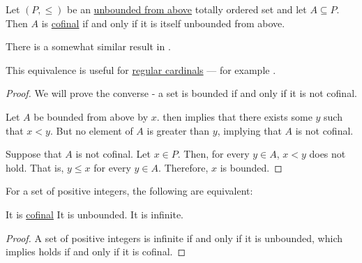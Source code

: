\begin{proposition}\label{thm:totally_ordered_cofinal_equivalences}
  Let \( (P, \leq) \) be an \hyperref[def:extremal_points/upper_and_lower_bounds]{unbounded from above} totally ordered set and let \( A \subseteq P \). Then \( A \) is \hyperref[def:cofinal_set]{cofinal} if and only if it is itself unbounded from above.
\end{proposition}
\begin{comments}
  \item There is a somewhat similar result in .
  \item This equivalence is useful for \hyperref[def:regular_cardinal]{regular cardinals} --- for example .
\end{comments}
\begin{proof}
  We will prove the converse - a set is bounded if and only if it is not cofinal.

  \SufficiencySubProof Let \( A \) be bounded from above by \( x \).  then implies that there exists some \( y \) such that \( x < y \). But no element of \( A \) is greater than \( y \), implying that \( A \) is not cofinal.

  \NecessitySubProof Suppose that \( A \) is not cofinal. Let \( x \in P \). Then, for every \( y \in A \), \( x < y \) does not hold. That is, \( y \leq x \) for every \( y \in A \). Therefore, \( x \) is bounded.
\end{proof}

\begin{corollary}\label{thm:natural_number_cofinal_subsets}
  For a set of positive integers, the following are equivalent:
  \begin{thmenum}
     It is \hyperref[def:cofinal_set]{cofinal}
     It is unbounded.
     It is infinite.
  \end{thmenum}
\end{corollary}
\begin{proof}
  A set of positive integers is infinite if and only if it is unbounded, which  implies holds if and only if it is cofinal.
\end{proof}

